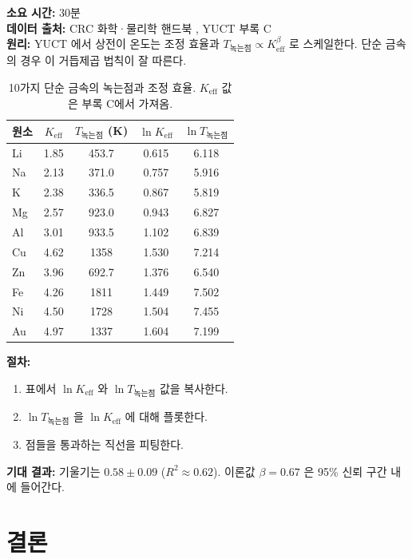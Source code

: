 \documentclass[12pt,a4paper]{article}
\newcommand{\Ke}{K_{\mathrm{eff}}}
\begin{document}
	\textbf{소요 시간:} 30분\\
	\textbf{데이터 출처:} CRC 화학·물리학 핸드북 \cite{CRC}, YUCT 부록 C \cite{AppendixC}\\
	\textbf{원리:} YUCT 에서 상전이 온도는 조정 효율과 \(T_{\text{녹는점}} \propto \Ke^{\beta}\) 로 스케일한다. 단순 금속의 경우 이 거듭제곱 법칙이 잘 따른다.
	
	\begin{table}[H]
		\centering
		\caption{10가지 단순 금속의 녹는점과 조정 효율. \(\Ke\) 값은 부록 C에서 가져옴.}
		\label{tab:melting}
		\begin{tabular}{l c c c c}
			\toprule
			원소 & \(\Ke\) & \(T_{\text{녹는점}}\) (K) & \(\ln \Ke\) & \(\ln T_{\text{녹는점}}\) \\
			\midrule
			Li & 1.85 & 453.7 & 0.615 & 6.118 \\
			Na & 2.13 & 371.0 & 0.757 & 5.916 \\
			K  & 2.38 & 336.5 & 0.867 & 5.819 \\
			Mg & 2.57 & 923.0 & 0.943 & 6.827 \\
			Al & 3.01 & 933.5 & 1.102 & 6.839 \\
			Cu & 4.62 & 1358  & 1.530 & 7.214 \\
			Zn & 3.96 & 692.7 & 1.376 & 6.540 \\
			Fe & 4.26 & 1811  & 1.449 & 7.502 \\
			Ni & 4.50 & 1728  & 1.504 & 7.455 \\
			Au & 4.97 & 1337  & 1.604 & 7.199 \\
			\bottomrule
		\end{tabular}
	\end{table}
	
	\textbf{절차:}
	\begin{enumerate}[label=(\arabic*)]
		\item 표에서 \(\ln \Ke\) 와 \(\ln T_{\text{녹는점}}\) 값을 복사한다.
		\item \(\ln T_{\text{녹는점}}\) 을 \(\ln \Ke\) 에 대해 플롯한다.
		\item 점들을 통과하는 직선을 피팅한다.
	\end{enumerate}
	
	\textbf{기대 결과:} 기울기는 \(0.58 \pm 0.09\) (\(R^2 \approx 0.62\)).
	이론값 \(\beta = 0.67\) 은 95\% 신뢰 구간 내에 들어간다.
	
	\section{결론}
	
\end{document}
